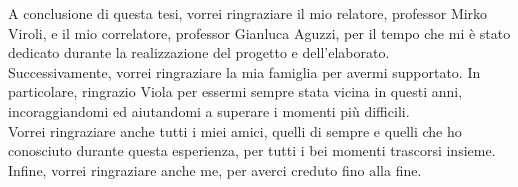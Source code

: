 \documentclass[12pt,a4paper,openright,twoside]{book}
\begin{document}

\backmatter



\begin{acknowledgements}
A conclusione di questa tesi, vorrei ringraziare il mio relatore, professor Mirko Viroli, e il mio correlatore, professor Gianluca 
Aguzzi, per il tempo che mi è stato dedicato durante la realizzazione del progetto e dell'elaborato.\\ Successivamente, vorrei ringraziare 
la mia famiglia per avermi supportato. In particolare, ringrazio Viola per essermi sempre stata vicina in questi anni, incoraggiandomi 
ed aiutandomi a superare i momenti più difficili.\\ Vorrei ringraziare anche tutti i miei amici, quelli di sempre e quelli 
che ho conosciuto durante questa esperienza, per tutti i bei momenti trascorsi insieme.\\
Infine, vorrei ringraziare anche me, per averci creduto fino alla fine.
\end{acknowledgements}
\end{document}
